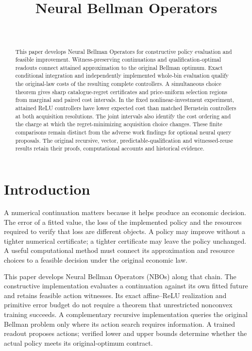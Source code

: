 \documentclass[ecta,nameyear,draft]{econsocart}
\begin{document}
\begin{frontmatter}
\title{Neural Bellman Operators}
\begin{aug}
\author[id=au1,addressref={add1}]{~}
\address[id=add1]{Peking University}
\end{aug}
\begin{abstract}
This paper develops Neural Bellman Operators for constructive policy evaluation and feasible improvement. Witness-preserving continuations and qualification-optimal readouts connect attained approximation to the original Bellman optimum. Exact conditional integration and independently implemented whole-bin evaluation qualify the original-law costs of the resulting complete controllers. A simultaneous choice theorem gives sharp catalogue-regret certificates and price-uniform selection regions from marginal and paired cost intervals. In the fixed nonlinear-investment experiment, attained ReLU controllers have lower expected cost than matched Bernstein controllers at both acquisition resolutions. The joint intervals also identify the cost ordering and the charge at which the regret-minimizing acquisition choice changes. These finite comparisons remain distinct from the adverse work findings for optional neural query proposals. The original recursive, vector, predictable-qualification and witnessed-reuse results retain their proofs, computational accounts and historical evidence.
\end{abstract}
\begin{keyword}
\end{keyword}
\end{frontmatter}
\section{Introduction}\label{sec:introduction65}
A numerical continuation matters because it helps produce an economic decision. The error of a fitted value, the loss of the implemented policy and the resources required to verify that loss are different objects. A policy may improve without a tighter numerical certificate; a tighter certificate may leave the policy unchanged. A useful computational method must connect its approximation and resource choices to a feasible decision under the original economic law.

This paper develops Neural Bellman Operators (NBOs) along that chain. The constructive implementation evaluates a continuation against its own fitted future and retains feasible action witnesses. Its exact affine--ReLU realization and primitive error budget do not require a theorem that unrestricted nonconvex training succeeds. A complementary recursive implementation queries the original Bellman problem only where its action search requires information. A trained readout proposes actions; verified lower and upper bounds determine whether the actual policy meets its original-optimum contract.
\end{document}
